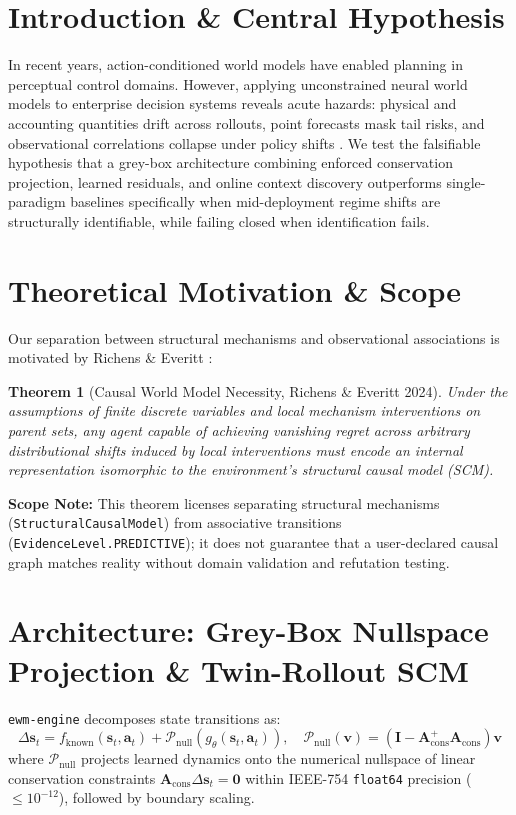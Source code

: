\documentclass[11pt,a4paper]{article}
\begin{document}
\section{Introduction \& Central Hypothesis}
In recent years, action-conditioned world models \cite{hafner2023dreamerv3, assran2025vjepa2} have enabled planning in perceptual control domains. However, applying unconstrained neural world models to enterprise decision systems reveals acute hazards: physical and accounting quantities drift across rollouts, point forecasts mask tail risks, and observational correlations collapse under policy shifts \cite{pearl2009causality}. We test the falsifiable hypothesis that a grey-box architecture combining enforced conservation projection, learned residuals, and online context discovery outperforms single-paradigm baselines specifically when mid-deployment regime shifts are structurally identifiable, while failing closed when identification fails.

\section{Theoretical Motivation \& Scope}
Our separation between structural mechanisms and observational associations is motivated by Richens \& Everitt \cite{richens2024robust}:
\newtheorem{theorem}{Theorem}
\begin{theorem}[Causal World Model Necessity, Richens \& Everitt 2024]
Under the assumptions of finite discrete variables and local mechanism interventions on parent sets, any agent capable of achieving vanishing regret across arbitrary distributional shifts induced by local interventions must encode an internal representation isomorphic to the environment's structural causal model (SCM).
\end{theorem}
\textbf{Scope Note:} This theorem licenses separating structural mechanisms (\texttt{StructuralCausalModel}) from associative transitions (\texttt{EvidenceLevel.PREDICTIVE}); it does not guarantee that a user-declared causal graph matches reality without domain validation and refutation testing.

\section{Architecture: Grey-Box Nullspace Projection \& Twin-Rollout SCM}
\texttt{ewm-engine} decomposes state transitions as:
\begin{equation}
\Delta \mathbf{s}_t = f_{\text{known}}(\mathbf{s}_t, \mathbf{a}_t) + \mathcal{P}_{\text{null}}\left( g_\theta(\mathbf{s}_t, \mathbf{a}_t) \right), \quad \mathcal{P}_{\text{null}}(\mathbf{v}) = (\mathbf{I} - \mathbf{A}_{\text{cons}}^+ \mathbf{A}_{\text{cons}})\mathbf{v}
\end{equation}
where $\mathcal{P}_{\text{null}}$ projects learned dynamics onto the numerical nullspace of linear conservation constraints $\mathbf{A}_{\text{cons}} \Delta \mathbf{s}_t = \mathbf{0}$ within IEEE-754 \texttt{float64} precision ($\le 10^{-12}$), followed by boundary scaling.
\end{document}
